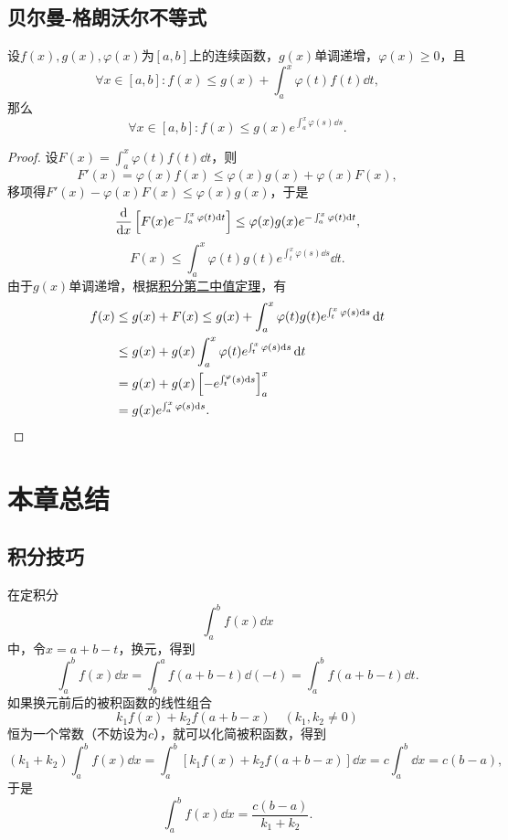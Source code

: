 \subsection{贝尔曼-格朗沃尔不等式}
\begin{theorem}\label{theorem:定积分.贝尔曼-格朗沃尔不等式}
设\(f(x),g(x),\varphi(x)\)为\([a,b]\)上的连续函数，\(g(x)\)单调递增，\(\varphi(x)\geq0\)，且\[
\forall x \in [a,b] : f(x) \leq g(x) + \int_a^x \varphi(t) f(t) \dd{t},
\]那么\[
\forall x \in [a,b] : f(x) \leq g(x) e^{\int_a^x \varphi(s) \dd{s}}.
\]
\begin{proof}
设\(F(x) = \int_a^x \varphi(t) f(t) \dd{t}\)，则\[
F'(x) = \varphi(x) f(x) \leq \varphi(x) g(x) + \varphi(x) F(x),
\]移项得\(F'(x) - \varphi(x) F(x) \leq \varphi(x) g(x)\)，于是\[
\dv{x}\left[F(x) e^{-\int_a^x \varphi(t) \dd{t}}\right]
\leq \varphi(x) g(x) e^{-\int_a^x \varphi(t) \dd{t}},
\]\[
F(x) \leq \int_a^x \varphi(t) g(t) e^{\int_t^x \varphi(s) \dd{s}} \dd{t}.
\]由于\(g(x)\)单调递增，根据\hyperref[theorem:定积分.积分中值定理2]{积分第二中值定理}，有\begin{align*}
f(x) &\leq g(x) + F(x)
\leq g(x) + \int_a^x \varphi(t) g(t) e^{\int_t^x \varphi(s) \dd{s}} \dd{t} \\
&\leq g(x) + g(x) \int_a^x \varphi(t) e^{\int_t^x \varphi(s) \dd{s}} \dd{t} \\
&= g(x) + g(x) \left[-e^{\int_t^ \varphi(s) \dd{s}}\right]_a^x \\
&= g(x) e^{\int_a^x \varphi(s) \dd{s}}.
\qedhere
\end{align*}
\end{proof}
\end{theorem}

\section{本章总结}
\subsection{积分技巧}

在定积分\[
\int_a^b f(x) \dd{x}
\]中，令\(x=a+b-t\)，换元，得到\[
\int_a^b f(x) \dd{x}
= \int_b^a f(a+b-t) \dd(-t)
= \int_a^b f(a+b-t) \dd{t}.
\]如果换元前后的被积函数的线性组合\[
k_1 f(x) + k_2 f(a+b-x) \quad(k_1,k_2\neq0)
\]恒为一个常数（不妨设为\(c\)），就可以化简被积函数，得到\[
(k_1 + k_2) \int_a^b f(x) \dd{x}
= \int_a^b [k_1 f(x) + k_2 f(a+b-x)] \dd{x}
= c \int_a^b \dd{x} = c(b-a),
\]于是\[
\int_a^b f(x) \dd{x}
= \frac{c(b-a)}{k_1 + k_2}.
\]

